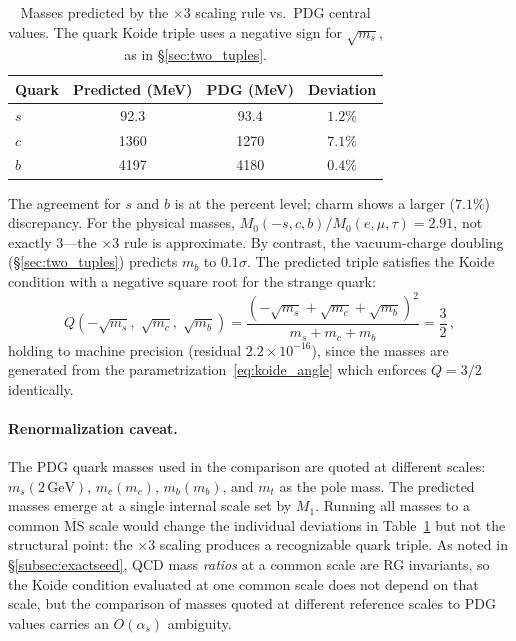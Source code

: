\documentclass[12pt,a4paper]{article}
\newcommand{\GeV}{\,\text{GeV}}
\begin{document}
\begin{table}[ht]
\centering
\caption{Masses predicted by the $\times 3$ scaling rule vs.\ PDG
central values. The quark Koide triple uses a negative sign for
$\sqrt{m_s}$, as in \S\ref{sec:two_tuples}.}
\label{tab:scaling_pred}
\begin{tabular}{lccc}
\toprule
Quark & Predicted (MeV) & PDG (MeV) & Deviation \\
\midrule
$s$ & 92.3 & 93.4 & $1.2\%$ \\
$c$ & 1360 & 1270 & $7.1\%$ \\
$b$ & 4197 & 4180 & $0.4\%$ \\
\bottomrule
\end{tabular}
\end{table}

The agreement for $s$ and $b$ is at the percent level; charm shows a
larger ($7.1\%$) discrepancy. For the physical masses,
$M_0(-s,c,b)/M_0(e,\mu,\tau) = 2.91$, not exactly $3$---the
$\times 3$ rule is approximate. By contrast, the vacuum-charge
doubling (\S\ref{sec:two_tuples}) predicts $m_b$ to $0.1\sigma$.
The predicted triple satisfies the
Koide condition with a negative square root for the strange quark:
\begin{equation}
Q(-\sqrt{m_s},\;\sqrt{m_c},\;\sqrt{m_b})
= \frac{(-\sqrt{m_s} + \sqrt{m_c} + \sqrt{m_b})^2}{m_s + m_c + m_b}
= \frac{3}{2}\,,
\end{equation}
holding to machine precision (residual $2.2 \times 10^{-16}$), since
the masses are generated from the parametrization~\eqref{eq:koide_angle}
which enforces $Q = 3/2$ identically.

\paragraph{Renormalization caveat.}
The PDG quark masses used in the comparison are quoted at different
scales: $m_s(2\GeV)$, $m_c(m_c)$, $m_b(m_b)$, and $m_t$ as the pole
mass. The predicted masses emerge at a single internal scale set by
$M_1$. Running all masses to a common $\overline{\text{MS}}$ scale
would change the individual deviations in Table~\ref{tab:scaling_pred}
but not the structural point: the $\times 3$ scaling produces a
recognizable quark triple. As noted in \S\ref{subsec:exactseed},
QCD mass \emph{ratios} at a common scale are RG invariants, so the
Koide condition evaluated at one common scale does not depend on that
scale, but the comparison of masses quoted at different reference
scales to PDG values carries an $O(\alpha_s)$ ambiguity.
\end{document}
